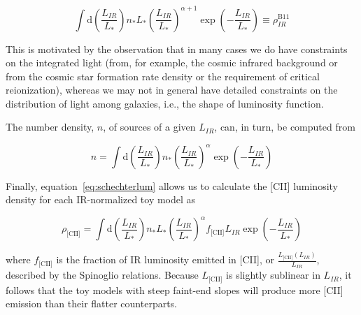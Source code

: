 \documentclass[12pt,preprint]{emulateapj}
\begin{document}
\begin{equation}
\int \textrm{d}\left(\frac{L_{IR}}{L_*}\right) n_* L_* \left(\frac{L_{IR}}{L_*}\right)^{\alpha+1} \exp\left(-\frac{L_{IR}}{L_*}\right) \equiv \rho_{IR}^{\textrm{B11}}
\label{eq:schechterlum}
\end{equation}

This is motivated by the observation that in many cases we do have constraints on the integrated light (from, for example, the cosmic infrared background or from the cosmic star formation rate density or the requirement of critical reionization), whereas we may not in general have detailed constraints on the distribution of light among galaxies, i.e., the shape of luminosity function.
 
The number density, $n$, of sources of a given $L_{IR}$, can, in turn, be computed from 

\begin{equation}
n = \int \textrm{d}\left(\frac{L_{IR}}{L_*}\right) n_* \left(\frac{L_{IR}}{L_*}\right)^{\alpha}\exp\left(-\frac{L_{IR}}{L_*}\right)
\end{equation}

Finally, equation~\ref{eq:schechterlum} allows us to calculate the [CII] luminosity density for each IR-normalized toy model as

\begin{equation}
\rho_{\textrm{[CII]}} = \int \textrm{d}\left(\frac{L_{IR}}{L_*}\right) n_* L_* \left(\frac{L_{IR}}{L_*}\right)^{\alpha} f_{\textrm{[CII]}}L_{IR} \exp\left(-\frac{L_{IR}}{L_*}\right) 
\end{equation}

where $f_{\textrm{[CII]}}$ is the fraction of IR luminosity emitted in [CII], or $\frac{L_{\textrm{[CII]}}(L_{IR})}{L_{IR}}$, described by the Spinoglio relations. Because $L_{\textrm{[CII]}}$ is slightly sublinear in $L_{IR}$, it follows that the toy models with steep faint-end slopes will produce more [CII] emission than their flatter counterparts. 


\end{document}

